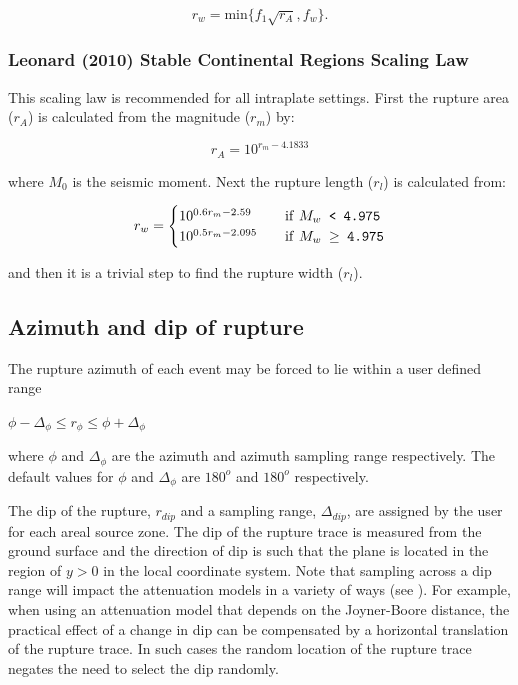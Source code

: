 \begin{equation}
r_w = \textrm{min$\{f_1\sqrt{r_A},f_w\}$}.
\end{equation}

\subsubsection{Leonard (2010) Stable Continental Regions Scaling Law}
This scaling law is recommended for all intraplate settings. First the rupture area ($r_A$) is calculated from the magnitude ($r_m$) by:

\begin{equation}
r_{A} = 10^{r_m-4.1833}
\end{equation}

where $M_{0}$ is the seismic moment. Next the rupture length ($r_l$) is calculated from:

\begin{equation}\label{leonard_rw}
r_w = 
\begin{cases}
10^{0.6r_m-2.59}	& \quad \mbox{if \texttt{$M_w$ < 4.975}} \\
10^{0.5r_m-2.095}	& \quad \mbox{if \texttt{$M_w$ $\ge$ 4.975}} \\
\end{cases}
\end{equation}

and then it is a trivial step to find the rupture width ($r_l$).

\subsection{Azimuth and dip of rupture}
\label{sec:az-dip-rupture}

The rupture azimuth of each event may be forced to lie within a
user defined range
\begin{center} $\phi - \Delta_{\phi} \leq r_\phi \leq \phi + \Delta_{\phi}$ \end{center}
where $\phi$ and $\Delta_{\phi}$ are the azimuth and azimuth sampling range respectively. The
default values for $\phi$ and $\Delta_{\phi}$ are $180^o$ and $180^o$
respectively. 

The dip of the rupture, $r_{dip}$ and a sampling range, $\Delta_{dip}$, are assigned by the 
user for each areal source zone. The dip of the rupture trace is measured from the
ground surface and the direction of dip is such that the plane is
located in the region of $y>0$ in the local coordinate system.
Note that sampling across a dip range will impact the attenuation models in a variety of ways (see ). 
For example, when using an attenuation model that depends 
on the Joyner-Boore distance, the practical effect of a change in dip can be compensated by a
horizontal translation of the rupture trace. In such cases the random
location of the rupture trace negates the need to select the dip randomly.

